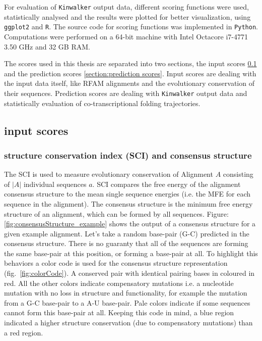 \documentclass[ twoside,openright,titlepage,numbers=noenddot,headinclude,%
                footinclude=false, cleardoublepage=empty,abstractoff, %
                BCOR=5mm,paper=a4,fontsize=11pt,%
                ngerman,american,%
                ]{scrreprt}
\begin{document}
For evaluation of \texttt{Kinwalker} output data, different scoring functions were used, statistically analysed and the results were plotted for better visualization, using  \texttt{ggplot2}\citep{ggplot2} and  \texttt{R}\citep{R}. The source code for scoring functions was implemented in  \texttt{Python}\cite{python}. 
Computations were performed on a 64-bit machine with Intel Octacore i7-4771 3.50 GHz and 32 GB RAM.

The scores used in this thesis are separated into two sections, the input scores \ref{section:input scores} and the prediction scores \ref{section:prediction scores}.
Input scores are dealing with the input data itself, like RFAM alignments and the evolutionary conservation of their sequences. Prediction scores are dealing with \texttt{Kinwalker} output data and statistically evaluation of co-transcriptional folding trajectories.  

\subsection{input scores} \label{section:input scores}

\subsubsection{structure conservation index (SCI)\cite{Washietl:2005} and consensus structure}
			
The SCI is used to measure evolutionary conservation of Alignment $A$
consisting of ${|A|}$ individual sequences $a$.
SCI compares the free energy of the alignment consensus structure to the
mean single sequence energies (i.e. the MFE for each sequence in the
alignment). The consensus structure is the minimum free energy structure of
an alignment, which can be formed by all sequences. Figure:
\ref{fig:consensusStructure_example} shows the output of a consensus
structure for a given example alignment. Let's take a random base-pair
(G-C) predicted in the consensus structure. There is no guaranty that all
of the sequences are forming the same base-pair at this position, or
forming a base-pair at all. To highlight this behaviors a color code is
used for the consensus structure representation (fig.~\ref{fig:colorCode}). A
conserved pair with identical pairing bases in coloured in red. All the other colors indicate compensatory mutations i.e. a nucleotide mutation with no loss in structure and functionality, for example the mutation from a G-C base-pair to a A-U base-pair. Pale colors indicate if some sequences cannot form this base-pair at all. Keeping this code in mind, a blue region indicated a higher structure conservation (due to compensatory mutations) than a red region.
\end{document}
